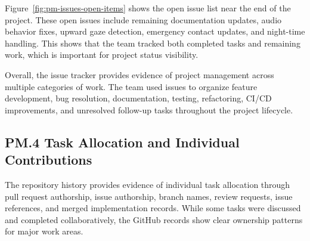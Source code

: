 \documentclass[11pt]{report}
\begin{document}
Figure~\ref{fig:pm-issues-open-items} shows the open issue list near the end of the project. These open issues include remaining documentation updates, audio behavior fixes, upward gaze detection, emergency contact updates, and night-time handling. This shows that the team tracked both completed tasks and remaining work, which is important for project status visibility.

Overall, the issue tracker provides evidence of project management across multiple categories of work. The team used issues to organize feature development, bug resolution, documentation, testing, refactoring, CI/CD improvements, and unresolved follow-up tasks throughout the project lifecycle.

\subsection*{PM.4 Task Allocation and Individual Contributions}

The repository history provides evidence of individual task allocation through pull request authorship, issue authorship, branch names, review requests, issue references, and merged implementation records. While some tasks were discussed and completed collaboratively, the GitHub records show clear ownership patterns for major work areas.
\end{document}
